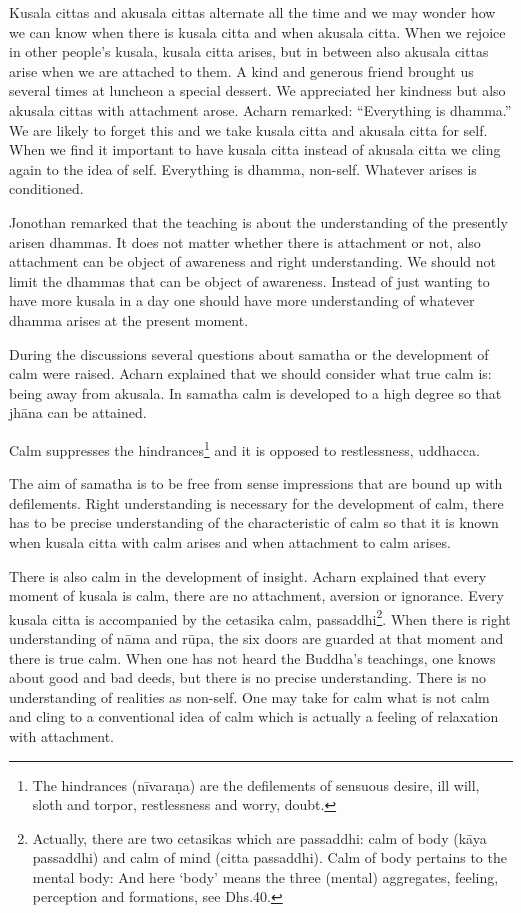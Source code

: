 Kusala cittas and akusala cittas alternate all the time and we may
wonder how we can know when there is kusala citta and when akusala
citta. When we rejoice in other people's kusala, kusala citta arises,
but in between also akusala cittas arise when we are attached to them. A
kind and generous friend brought us several times at luncheon a special
dessert. We appreciated her kindness but also akusala cittas with
attachment arose. Acharn remarked: ``Everything is dhamma.'' We are
likely to forget this and we take kusala citta and akusala citta for
self. When we find it important to have kusala citta instead of akusala
citta we cling again to the idea of self. Everything is dhamma,
non-self. Whatever arises is conditioned.

Jonothan remarked that the teaching is about the understanding of the
presently arisen dhammas. It does not matter whether there is attachment
or not, also attachment can be object of awareness and right
understanding. We should not limit the dhammas that can be object of
awareness. Instead of just wanting to have more kusala in a day one
should have more understanding of whatever dhamma arises at the present
moment.~

During the discussions several questions about samatha or the
development of calm were raised. Acharn explained that we should
consider what true calm is: being away from akusala. In samatha calm is
developed to a high degree so that jhāna can be attained.

Calm suppresses the
hindrances\footnote{The hindrances
(nīvaraṇa) are the defilements of sensuous desire, ill will, sloth and
torpor, restlessness and worry, doubt.} and it is
opposed to restlessness, uddhacca.

The aim of samatha is to be free from sense impressions that are bound
up with defilements. Right understanding is necessary for the
development of calm, there has to be precise understanding of the
characteristic of calm so that it is known when kusala citta with calm
arises and when attachment to calm arises.

There is also calm in the development of insight. Acharn explained that
every moment of kusala is calm, there are no attachment, aversion or
ignorance. Every kusala citta is accompanied by the cetasika calm,
passaddhi\footnote{Actually, there are two
cetasikas which are passaddhi: calm of body (kāya passaddhi) and calm of
mind (citta passaddhi). Calm of body pertains to the mental body: And
here `body' means the three (mental) aggregates, feeling, perception and
formations, see Dhs.40.}. When there is
right understanding of nāma and rūpa, the six doors are guarded at that
moment and there is true calm. When one has not heard the Buddha's
teachings, one knows about good and bad deeds, but there is no precise
understanding. There is no understanding of realities as non-self. One
may take for calm what is not calm and cling to a conventional idea of
calm which is actually a feeling of relaxation with attachment.

